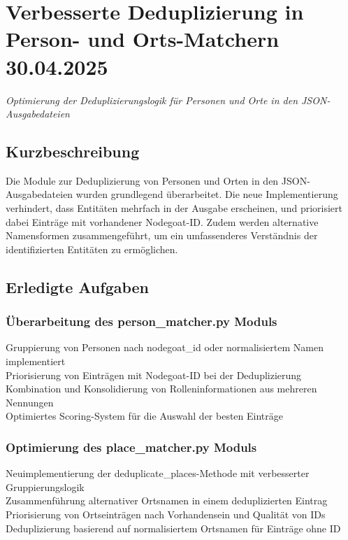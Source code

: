 \documentclass{article}
\begin{document}
\noindent\hrulefill

\section{Verbesserte Deduplizierung in Person- und Orts-Matchern \small 30.04.2025}
\small\textit{Optimierung der Deduplizierungslogik für Personen und Orte in den JSON-Ausgabedateien}\\

\subsection*{Kurzbeschreibung}
Die Module zur Deduplizierung von Personen und Orten in den JSON-Ausgabedateien wurden grundlegend überarbeitet. Die neue Implementierung verhindert, dass Entitäten mehrfach in der Ausgabe erscheinen, und priorisiert dabei Einträge mit vorhandener Nodegoat-ID. Zudem werden alternative Namensformen zusammengeführt, um ein umfassenderes Verständnis der identifizierten Entitäten zu ermöglichen.

\subsection*{Erledigte Aufgaben}
\subsubsection*{\small Überarbeitung des person\_matcher.py Moduls}
 Gruppierung von Personen nach nodegoat\_id oder normalisiertem Namen implementiert\\
 Priorisierung von Einträgen mit Nodegoat-ID bei der Deduplizierung\\
 Kombination und Konsolidierung von Rolleninformationen aus mehreren Nennungen\\
 Optimiertes Scoring-System für die Auswahl der besten Einträge

\subsubsection*{\small Optimierung des place\_matcher.py Moduls}
 Neuimplementierung der deduplicate\_places-Methode mit verbesserter Gruppierungslogik\\
 Zusammenführung alternativer Ortsnamen in einem deduplizierten Eintrag\\
 Priorisierung von Ortseinträgen nach Vorhandensein und Qualität von IDs\\
 Deduplizierung basierend auf normalisiertem Ortsnamen für Einträge ohne ID
\end{document}
